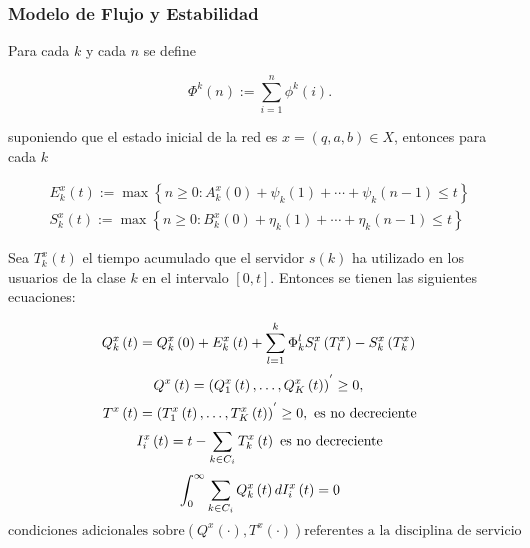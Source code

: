 \subsubsection{Modelo de Flujo y Estabilidad}

Para cada $k$ y cada $n$ se define

\begin{equation}
\Phi^{k}\left(n\right):=\sum_{i=1}^{n}\phi^{k}\left(i\right).
\end{equation}

suponiendo que el estado inicial de la red es
$x=\left(q,a,b\right)\in X$, entonces para cada $k$

\begin{eqnarray}
E_{k}^{x}\left(t\right):=\max\left\{n\geq0:A_{k}^{x}\left(0\right)+\psi_{k}\left(1\right)+\cdots+\psi_{k}\left(n-1\right)\leq t\right\}\\
S_{k}^{x}\left(t\right):=\max\left\{n\geq0:B_{k}^{x}\left(0\right)+\eta_{k}\left(1\right)+\cdots+\eta_{k}\left(n-1\right)\leq
t\right\}
\end{eqnarray}

Sea $T_{k}^{x}\left(t\right)$ el tiempo acumulado que el servidor
$s\left(k\right)$ ha utilizado en los usuarios de la clase $k$ en
el intervalo $\left[0,t\right]$. Entonces se tienen las siguientes
ecuaciones:

\begin{equation}
Q_{k}^{x}\left(t\right)=Q_{k}^{x}\left(0\right)+E_{k}^{x}\left(t\right)+\sum_{l=1}^{k}\Phi_{k}^{l}S_{l}^{x}\left(T_{l}^{x}\right)-S_{k}^{x}\left(T_{k}^{x}\right)\\
\end{equation}
\begin{equation}
Q^{x}\left(t\right)=\left(Q^{x}_{1}\left(t\right),\ldots,Q^{x}_{K}\left(t\right)\right)^{'}\geq0,\\
\end{equation}
\begin{equation}
T^{x}\left(t\right)=\left(T^{x}_{1}\left(t\right),\ldots,T^{x}_{K}\left(t\right)\right)^{'}\geq0,\textrm{ es no decreciente}\\
\end{equation}
\begin{equation}
I_{i}^{x}\left(t\right)=t-\sum_{k\in C_{i}}T_{k}^{x}\left(t\right)\textrm{ es no decreciente}\\
\end{equation}
\begin{equation}
\int_{0}^{\infty}\sum_{k\in C_{i}}Q_{k}^{x}\left(t\right)dI_{i}^{x}\left(t\right)=0\\
\end{equation}
\begin{equation}
\textrm{condiciones adicionales sobre
}\left(Q^{x}\left(\cdot\right),T^{x}\left(\cdot\right)\right)\textrm{
referentes a la disciplina de servicio}
\end{equation}

